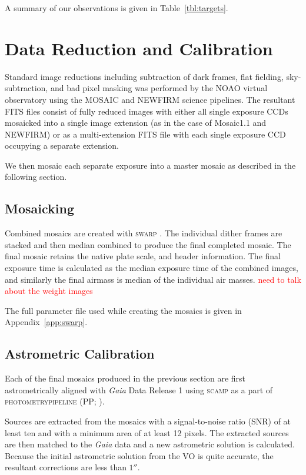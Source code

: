 \documentclass[apj, revtex4]{emulateapj}
\newcommand{\editorial}[1]{\textcolor{red}{#1}}
\begin{document}
A summary of our observations is given in Table~\ref{tbl:targets}.


\section{Data Reduction and Calibration}\label{sec:data reduction}
Standard image reductions including subtraction of dark frames, flat fielding, sky-subtraction, and bad pixel masking was performed by the NOAO virtual observatory using the MOSAIC \citep{Valdes2007} and NEWFIRM \citep{Swaters2009} science pipelines. The resultant FITS files consist of fully reduced images with either all single exposure CCDs mosaicked into a single image extension (as in the case of Mosaic1.1 and NEWFIRM) or as a multi-extension FITS file with each single exposure CCD occupying a separate extension. 

We then mosaic each separate exposure into a master mosaic as described in the following section.

\subsection{Mosaicking}
Combined mosaics are created with \textsc{swarp} \citep{Bertin2002}. The individual dither frames are stacked and then median combined to produce the final completed mosaic. The final mosaic retains the native plate scale, and header information. The final exposure time is calculated as the median exposure time of the combined images, and similarly the final airmass is median of the individual air masses. \editorial{need to talk about the weight images}

The full parameter file used while creating the mosaics is given in Appendix~\ref{app:swarp}.

\subsection{Astrometric Calibration}
Each of the final mosaics produced in the previous section are first astrometrically aligned with \textit{Gaia} \citep{GaiaCollaboration2016} Data Release 1 \citep{GaiaCollaboration2016a} using \textsc{scamp} \citep{Bertin2006} as a part of \textsc{photometrypipeline} (PP; \citealt{Mommert2017}).

Sources are extracted from the mosaics with a signal-to-noise ratio (SNR) of at least ten and with a minimum area of at least 12 pixels. The extracted sources are then matched to the \textit{Gaia} data and a new astrometric solution is calculated. Because the initial astrometric solution from the VO is quite accurate, the resultant corrections are less than $1''$.
\end{document}
